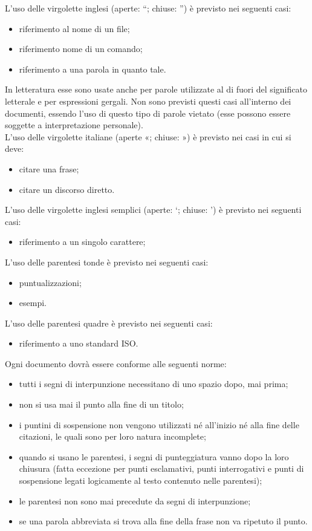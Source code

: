 					L’uso delle virgolette inglesi (aperte: “; chiuse: ”) è previsto nei seguenti casi:
					\begin{itemize}
						\item riferimento al nome di un file;
						\item riferimento nome di un comando;
						\item riferimento a una parola in quanto tale.
					\end{itemize}
					In letteratura esse sono usate anche per parole utilizzate al di fuori del significato letterale e per espressioni gergali. Non sono previsti questi casi all’interno dei documenti, essendo l’uso di questo tipo di parole vietato (esse possono essere soggette a interpretazione personale).\\
					L’uso delle virgolette italiane (aperte «; chiuse: ») è previsto nei casi in cui si deve:
					\begin{itemize}
						\item citare una frase;
						\item citare un discorso diretto.
					\end{itemize}
					L’uso delle virgolette inglesi semplici (aperte: ‘; chiuse: ’) è previsto nei seguenti casi:
					\begin{itemize}
						\item riferimento a un singolo carattere;
					\end{itemize}
					L’uso delle parentesi tonde è previsto nei seguenti casi:
					\begin{itemize}
						\item puntualizzazioni;
						\item esempi.
					\end{itemize}
					L’uso delle parentesi quadre è previsto nei seguenti casi:
					\begin{itemize}
						\item riferimento a uno standard ISO.
					\end{itemize}
					Ogni documento dovrà essere conforme alle seguenti norme:
					\begin{itemize}
						\item tutti i segni di interpunzione necessitano di uno spazio dopo, mai prima;
						\item non si usa mai il punto alla fine di un titolo;
						\item i puntini di sospensione non vengono utilizzati né all’inizio né alla fine delle citazioni, le quali sono per loro natura incomplete;
						\item quando si usano le parentesi, i segni di punteggiatura vanno dopo la loro chiusura (fatta eccezione per punti esclamativi, punti interrogativi e punti di sospensione legati logicamente al testo contenuto nelle parentesi);
						\item le parentesi non sono mai precedute da segni di interpunzione;
						\item se una parola abbreviata si trova alla fine della frase non va ripetuto il punto.
					\end{itemize}
